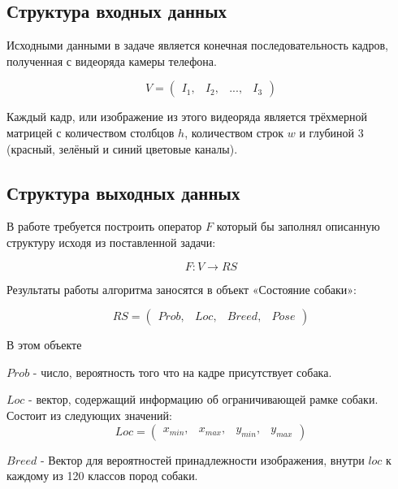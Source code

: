 \subsection{Структура входных данных}
Исходными данными в задаче является конечная последовательность кадров, полученная с видеоряда  камеры телефона.

\begin{equation}
    V = \begin{pmatrix}
                I_1, & I_2, & ..., & I_3
        \end{pmatrix}
\end{equation}          

Каждый кадр, или изображение из этого видеоряда является трёхмерной матрицей с количеством столбцов  $h$, количеством строк $w$ и глубиной 3 (красный, зелёный и синий цветовые каналы). 


\subsection{Структура выходных данных}\label{input_struct}
В работе требуется построить оператор $F$  который бы заполнял описанную структуру исходя из поставленной задачи:

\begin{equation}
    F:V \rightarrow RS
\end{equation}

Результаты работы алгоритма заносятся в объект «Состояние собаки»:

\begin{equation}
    RS = \begin{pmatrix}
            Prob, & Loc, & Breed, & Pose 
        \end{pmatrix}
\end{equation}

В этом объекте

$Prob$ - число, вероятность того что на кадре присутствует собака.

$Loc$ - вектор, содержащий информацию об ограничивающей рамке собаки. Состоит из следующих значений:
\begin{equation}
Loc =   \begin{pmatrix}
                x_{min}, & x_{max}, & y_{min}, & y_{max} 
        \end{pmatrix}
\end{equation}

$Breed$ - Вектор для вероятностей принадлежности изображения, внутри $loc$ к каждому из 120 классов пород собаки.

